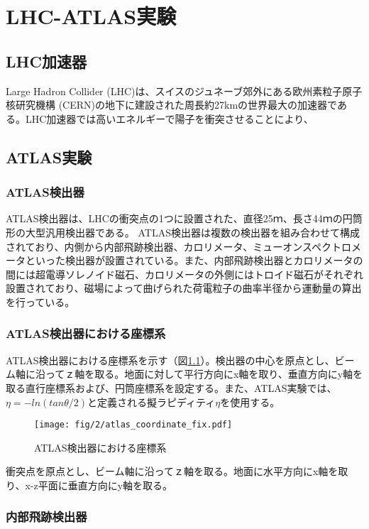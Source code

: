 \chapter{LHC-ATLAS実験}
\label{chapter2}

\section{LHC加速器}
\label{section2-1}

Large Hadron Collider (LHC)は、スイスのジュネーブ郊外にある欧州素粒子原子核研究機構 (CERN)の地下に建設された周長約27kmの世界最大の加速器である。LHC加速器では高いエネルギーで陽子を衝突させることにより、


\section{ATLAS実験}
\label{section2-2}
\subsection{ATLAS検出器}
ATLAS検出器は、LHCの衝突点の1つに設置された、直径25ｍ、長さ44ｍの円筒形の大型汎用検出器である。
ATLAS検出器は複数の検出器を組み合わせて構成されており、内側から内部飛跡検出器、カロリメータ、ミューオンスペクトロメータといった検出器が設置されている。また、内部飛跡検出器とカロリメータの間には超電導ソレノイド磁石、カロリメータの外側にはトロイド磁石がそれぞれ設置されており、磁場によって曲げられた荷電粒子の曲率半径から運動量の算出を行っている。


\subsection{ATLAS検出器における座標系}
ATLAS検出器における座標系を示す（図\ref{fig:a}）。検出器の中心を原点とし、ビーム軸に沿ってｚ軸を取る。地面に対して平行方向にx軸を取り、垂直方向にy軸を取る直行座標系および、円筒座標系を設定する。また、ATLAS実験では、$\eta=-ln(tan\theta/2)$と定義される擬ラピディティ$\eta$を使用する。

\begin{figure}[tb]
  \centering
  \texttt{[image: fig/2/atlas\_coordinate\_fix.pdf]}
  \caption{ATLAS検出器における座標系}
  \label{fig:a}
\end{figure}

衝突点を原点とし、ビーム軸に沿ってｚ軸を取る。地面に水平方向にx軸を取り、x-z平面に垂直方向にy軸を取る。

\subsection{内部飛跡検出器}

